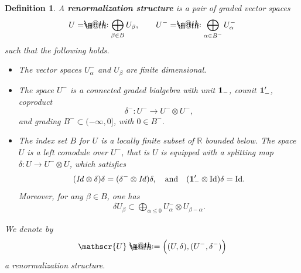 \documentclass[10pt, reqno]{amsart}
\makeatletter
\numberwithin{subsection}{section}
\numberwithin{subsubsection}{subsection}
\numberwithin{equation}{section} %
\theoremstyle{mystyle}
\newtheorem{defn}[thm]{ \hspace{-0.31cm} {Definition}}%
\theoremstyle{mystyle2}
\theoremstyle{mystyle3}
\newcommand{\iden}{\text{\rm Id}}
\newcommand\bbR{\mathbb{R}}
\newcommand*{\defeq}{\mathrel{\rlap{%
                     \raisebox{0.3ex}{$\m@th\cdot$}}%
                     \raisebox{-0.3ex}{$\m@th\cdot$}}%
                     =}
\newcommand*{\eqdef}{=\mathrel{\rlap{%
                     \raisebox{0.3ex}{$\m@th\cdot$}}%
                     \raisebox{-0.3ex}{$\m@th\cdot$}}%
                     }
\makeatother
\begin{document}
\medskip

\begin{defn} \label{DefnRenormalizationStructure}
A \textsf{\textbf{renormalization structure}} is a pair of graded vector spaces  
$$
U \eqdef \bigoplus_{\beta\in B} U_\beta, \qquad U^- \eqdef \bigoplus_{\alpha\in B^-} U_\alpha^-  
$$
such that the following holds.   \vspace{0.1cm}

\begin{itemize}
\setlength{\itemsep}{0.1cm}
   \item The vector spaces $U_\alpha^-$ and $U_\beta$ are finite dimensional.

   \item The space $U^-$ is a connected graded bialgebra with unit ${\bf1}_-$, counit ${\bf1}_-'$, coproduct 
$$
\delta^-:U^-\to U^-\otimes U^-,
$$ 
and grading $B^-\subset(-\infty,0]$, with $0\in B^-$.

   \item The index set $B$ for $U$ is a locally finite subset of $\bbR$ bounded below. The space $U$ is a left comodule over $U^-$, that is $U$ is 
equipped with a splitting map $\delta : U \rightarrow U^-\otimes U$, which satisfies 
\begin{align} \label{U is comodule over U^-}
(\textrm{\emph{Id}}\otimes\delta)\delta = (\delta^-\otimes\textrm{\emph{Id}})\delta,\quad\textrm{and}\quad ({\bf1}_-'\otimes\iden)\delta=\iden.
\end{align}
Moreover, for any $\beta\in B$, one has
\begin{align}\label{EqSpecialRenorm}
\delta U_\beta \subset {\bigoplus_{\alpha\le0} } U_{\alpha}^-\otimes U_{\beta-\alpha}.
\end{align}
\end{itemize}
We denote by 
$$
\mathscr{U} \defeq  \Big((U,\delta), (U^-,\delta^-)\Big)
$$
a renormalization structure.
\end{defn} 

\medskip
\end{document}
